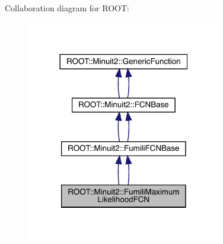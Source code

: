 Collaboration diagram for R\+O\+OT\+:\nopagebreak
\begin{figure}[H]
\begin{center}
\leavevmode
\includegraphics[width=240pt]{d8/d03/classROOT_1_1Minuit2_1_1FumiliMaximumLikelihoodFCN__coll__graph}
\end{center}
\end{figure}
